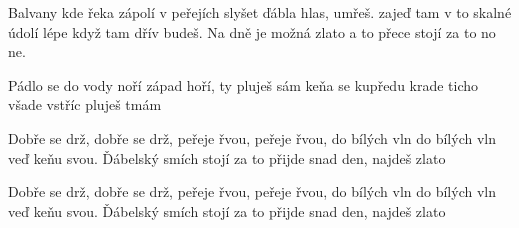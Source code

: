 
\beginverse{}
Balvany kde řeka zápolí
v peřejích slyšet ďábla hlas, umřeš.
zajeď tam v to skalné údolí
lépe když tam dřív budeš.
Na dně je možná zlato
a to přece stojí za to no ne.
\endverse{}

\beginverse{}
\chordsoff{}
Pádlo se do vody noří
západ hoří, ty pluješ sám
keňa se kupředu krade
ticho všade vstříc pluješ tmám
\chordson{}
\endverse{}

\beginchorus{}
Dobře se drž, dobře se drž,
peřeje řvou, peřeje řvou,
do bílých vln do bílých vln
veď keňu svou.
Ďábelský smích stojí za to
přijde snad den, najdeš zlato
\endchorus{}

\repeatingchorus{}
\beginchorus{}
\chordsoff{}
Dobře se drž, dobře se drž,
peřeje řvou, peřeje řvou,
do bílých vln do bílých vln
veď keňu svou.
Ďábelský smích stojí za to
přijde snad den, najdeš zlato
\chordson{}
\endchorus{}

\endsong{}
